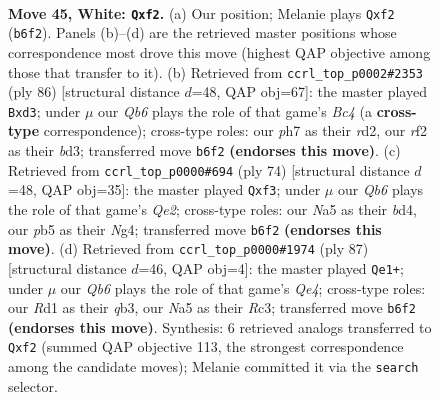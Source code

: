 \documentclass[11pt]{article}
\begin{document}
\clearpage

\begin{figure}[p]\centering
\begin{subfigure}{0.46\textwidth}\centering
\resizebox{\linewidth}{!}{%
\newchessgame
\chessboard[
  setfen={7k/6rp/1Q5P/Np6/6P1/8/PP3r1K/3R4 w - - 0 45},
  showmover=false,
  pgfstyle=straightmove, color=movearrow, markmove={b6-f2}
]}
\caption{}
\end{subfigure}\hfill
\begin{subfigure}{0.46\textwidth}\centering
\resizebox{\linewidth}{!}{%
\newchessgame
\chessboard[
  setfen={1Q6/6k1/5p2/1P2r3/P1B2p1p/3b1P1P/3r4/5K2 w - - 3 44},
  showmover=false,
  pgfstyle=straightmove, color=movearrow, markmove={c4-d3}
]}
\caption{}
\end{subfigure}
\\[4pt]
\begin{subfigure}{0.46\textwidth}\centering
\resizebox{\linewidth}{!}{%
\newchessgame
\chessboard[
  setfen={5r2/p6k/7p/7P/3b2N1/5rK1/P3Q3/8 w - - 0 38},
  showmover=false,
  pgfstyle=straightmove, color=movearrow, markmove={e2-f3}
]}
\caption{}
\end{subfigure}\hfill
\begin{subfigure}{0.46\textwidth}\centering
\resizebox{\linewidth}{!}{%
\newchessgame
\chessboard[
  setfen={8/5p1k/7p/p2PqR2/P7/1Qr4P/6R1/7K b - - 0 44},
  showmover=false,
  pgfstyle=straightmove, color=movearrow, markmove={e5-e1}
]}
\caption{}
\end{subfigure}
\caption{\textbf{Move 45, White: \texttt{Qxf2}.} (a) Our position; Melanie plays \texttt{Qxf2} (\texttt{b6f2}). Panels (b)--(d) are the retrieved master positions whose correspondence most drove this move (highest QAP objective among those that transfer to it). (b) Retrieved from \texttt{ccrl\_top\_p0002\#2353} (ply 86) [structural distance $d$=48, QAP obj=67]: the master played \texttt{Bxd3}; under $\mu$ our \emph{Qb6} plays the role of that game's \emph{Bc4} (a \textbf{cross-type} correspondence); cross-type roles: our \emph{p}h7 as their \emph{r}d2, our \emph{r}f2 as their \emph{b}d3; transferred move \texttt{b6f2} \textbf{(endorses this move)}. (c) Retrieved from \texttt{ccrl\_top\_p0000\#694} (ply 74) [structural distance $d$=48, QAP obj=35]: the master played \texttt{Qxf3}; under $\mu$ our \emph{Qb6} plays the role of that game's \emph{Qe2}; cross-type roles: our \emph{N}a5 as their \emph{b}d4, our \emph{p}b5 as their \emph{N}g4; transferred move \texttt{b6f2} \textbf{(endorses this move)}. (d) Retrieved from \texttt{ccrl\_top\_p0000\#1974} (ply 87) [structural distance $d$=46, QAP obj=4]: the master played \texttt{Qe1+}; under $\mu$ our \emph{Qb6} plays the role of that game's \emph{Qe4}; cross-type roles: our \emph{R}d1 as their \emph{q}b3, our \emph{N}a5 as their \emph{R}c3; transferred move \texttt{b6f2} \textbf{(endorses this move)}. Synthesis: 6 retrieved analogs transferred to \texttt{Qxf2} (summed QAP objective 113, the strongest correspondence among the candidate moves); Melanie committed it via the \texttt{search} selector.}
\label{fig:thought-m88}
\end{figure}
\end{document}
